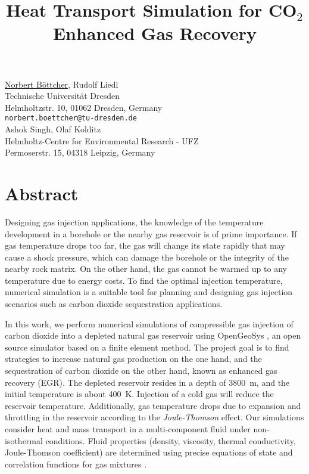 

\title{Heat Transport Simulation for CO$_2$ Enhanced Gas Recovery}
\author{} \institute{} %
\maketitle
\begin{center}
{\large \underline{Norbert B\"ottcher}, Rudolf Liedl}\\
Technische Universit\"at Dresden\\
Helmholtzstr. 10, 01062 Dresden, Germany\\
{\tt norbert.boettcher@tu-dresden.de}\\
\vspace{4mm} %
{\large Ashok Singh, Olaf Kolditz}\\
Helmholtz-Centre for Environmental Research - UFZ\\
Permoserstr. 15, 04318 Leipzig, Germany
\end{center}

\section*{Abstract}


Designing gas injection applications, the knowledge of the temperature development in a borehole or the nearby gas reservoir is of prime importance. If gas temperature drops too far, the gas will change its state rapidly that may cause a shock pressure, which can damage the borehole or the integrity of the nearby rock matrix. On the other hand, the gas cannot be warmed up to any temperature due to energy costs. To find the optimal injection temperature, numerical simulation is a suitable tool for planning and designing gas injection scenarios such as carbon dioxide sequestration applications. 

In this work, we perform numerical simulations of compressible gas injection of carbon dioxide into a depleted natural gas reservoir using OpenGeoSys \cite{Wang2009}, an open source simulator based on a finite element method. The project goal is to find strategies to increase natural gas production on the one hand, and the sequestration of carbon dioxide on the other hand, known as enhanced gas recovery (EGR). The depleted reservoir resides in a depth of 3800~m, and the initial temperature is about 400~K. Injection of a cold gas will reduce the reservoir temperature. Additionally, gas temperature drops due to expansion and throttling in the reservoir according to the \textit{Joule-Thomson} \cite{SpaWag96} effect. Our simulations consider heat and mass transport in a multi-component fluid under non-isothermal conditions. Fluid properties (density, viscosity, thermal conductivity, Joule-Thomson coefficient) are determined using precise equations of state and correlation functions for gas mixtures \cite{Duan2008}.

